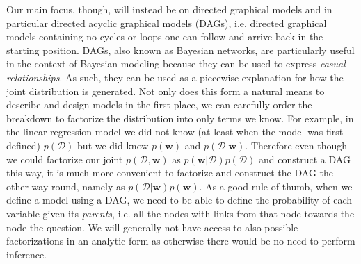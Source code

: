 Our main focus, though, will instead be on directed graphical models and in particular directed acyclic 
graphical models (DAGs), i.e. directed graphical models containing no cycles or loops one can follow 
and arrive back in the starting position.  DAGs, also known as Bayesian networks, are particularly
useful in the context of Bayesian modeling because they can be used to express \emph{casual relationships}.
As such, they can be used as a piecewise explanation for how the joint distribution is generated.
Not only does this form a natural means to describe and design models in the first place, 
we can carefully order the breakdown to factorize the distribution into only terms we know.  For example,
in the linear regression model we did not know (at least when the model was first defined) 
$p(\mathcal{D})$ but we did know $p(\mathbf{w})$ and $p(\mathcal{D} | \mathbf{w})$.  Therefore even
though we could factorize our joint $p(\mathcal{D}, \mathbf{w})$ as 
$p(\mathbf{w} | \mathcal{D})p(\mathcal{D})$ and construct a DAG this way, it is much more convenient
to factorize and construct the DAG the other way round, namely as 
$p(\mathcal{D} | \mathbf{w})p(\mathbf{w})$.
As a good rule of thumb, when we define a model using a DAG, we need to be able to define the 
probability of each variable given its \emph{parents}, i.e. all the nodes with links from that node
towards the node the question.  We will generally not have access to also possible factorizations
in an analytic form as otherwise there would be no need to perform inference.

